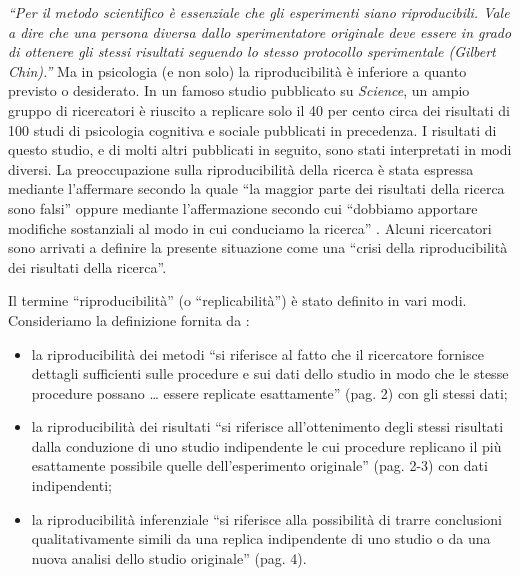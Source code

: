 \documentclass[
  11pt,
]{krantz}
\theoremstyle{definition}
\theoremstyle{definition}
\theoremstyle{definition}
\theoremstyle{definition}
\theoremstyle{remark}
\begin{document}
\emph{``Per il metodo scientifico è essenziale che gli esperimenti siano riproducibili. Vale a dire che una persona diversa dallo sperimentatore originale deve essere in grado di ottenere gli stessi risultati seguendo lo stesso protocollo sperimentale (Gilbert Chin).''} Ma in psicologia (e non solo) la riproducibilità è inferiore a quanto previsto o desiderato. In un famoso studio pubblicato su \emph{Science}, un ampio gruppo di ricercatori \citep{open2015estimating} è riuscito a replicare solo il 40 per cento circa dei risultati di 100 studi di psicologia cognitiva e sociale pubblicati in precedenza. I risultati di questo studio, e di molti altri pubblicati in seguito, sono stati interpretati in modi diversi. La preoccupazione sulla riproducibilità della ricerca è stata espressa mediante l'affermare secondo la quale ``la maggior parte dei risultati della ricerca sono falsi'' \citep{ioannidis2005most} oppure mediante l'affermazione secondo cui ``dobbiamo apportare modifiche sostanziali al modo in cui conduciamo la ricerca'' \citep{cumming2014new}. Alcuni ricercatori sono arrivati a definire la presente situazione come una ``crisi della riproducibilità dei risultati della ricerca''.

Il termine ``riproducibilità'' (o ``replicabilità'') è stato definito in vari modi. Consideriamo la definizione fornita da \citet{goodman2016does}:

\begin{itemize}
\item
  la riproducibilità dei metodi ``si riferisce al fatto che il ricercatore fornisce dettagli sufficienti sulle procedure e sui dati dello studio in modo che le stesse procedure possano \ldots{} essere replicate esattamente'' (pag. 2) con gli stessi dati;
\item
  la riproducibilità dei risultati ``si riferisce all'ottenimento degli stessi risultati dalla conduzione di uno studio indipendente le cui procedure replicano il più esattamente possibile quelle dell'esperimento originale'' (pag. 2-3) con dati indipendenti;
\item
  la riproducibilità inferenziale ``si riferisce alla possibilità di trarre conclusioni qualitativamente simili da una replica indipendente di uno studio o da una nuova analisi dello studio originale'' (pag. 4).
\end{itemize}
\end{document}
